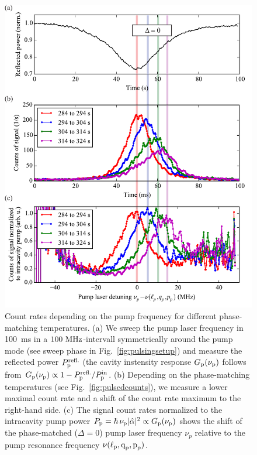 \documentclass[aps,pra,showpacs,reprint,onecolumn,notitlepage]{revtex4-1}
\newcommand{\tx}[1]{\textnormal{#1}}
\begin{document}
\begin{figure}[htb]
  \centering
  \includegraphics[scale=0.8]{pictures/exp_WGMR_detuning/SPDC_frequ_sweep.pdf} 
\caption{Count rates depending on the pump frequency for different phase-matching temperatures. (a) We sweep the pump laser frequency in \SI{100}{\ms} in a $100~\tx{MHz}$-intervall symmetrically around the pump mode (see sweep phase in Fig.~\ref{fig:pulsingsetup}) and measure the reflected power $P^\tx{refl.}_\tx{p}$ (the cavity instensity response ${G}_\tx{p} (\nu_\tx{p})$ follows from  ${G}_\tx{p}(\nu_\tx{p}) \propto 1 - P^\tx{refl.}_\tx{p} / P^\tx{in}_\tx{p}$. (b) Depending on the phase-matching temperatures (see Fig.~\ref{fig:pulsedcounts}), we measure a lower maximal count rate and a shift of the count rate maximum to the right-hand side. (c) The signal count rates normalized to the intracavity pump power $P_\tx{p} = \hbar \, \nu_\tx{p} |\hat{\alpha}|^2 \propto {G}_\tx{p} (\nu_\tx{p})$ shows the shift of the phase-matched ($\Delta=0$) pump laser frequency $\nu_p$ relative to the pump resonance frequency $\nu (\ell_\tx{p},\tx{q}_\tx{p},\tx{p}_\tx{p})$. }
	\label{lockingsignal}
\end{figure}
\end{document}
